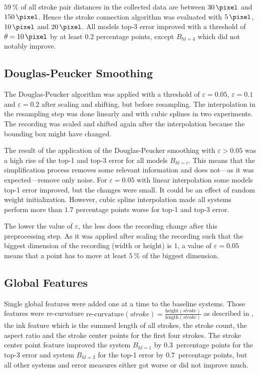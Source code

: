 $\SI{59}{\percent}$ of all stroke pair distances in the collected data are
between $\SI{30}{\pixel}$ and $\SI{150}{\pixel}$. Hence the stroke connection
algorithm was evaluated with $\SI{5}{\pixel}$, $\SI{10}{\pixel}$ and
$\SI{20}{\pixel}$.
All models top-3 error improved with a threshold of $\theta = \SI{10}{\pixel}$
by at least $\num{0.2}$ percentage points, except $B_{hl=4}$ which did not notably
improve.


\subsection{Douglas-Peucker Smoothing}
The Douglas-Peucker algorithm was applied with a threshold of $\varepsilon =
0.05$, $\varepsilon = 0.1$ and $\varepsilon = 0.2$ after scaling and shifting,
but before resampling. The interpolation in the resampling step was done
linearly and with cubic splines in two experiments. The recording was scaled
and shifted again after the interpolation because the bounding box might have
changed.

The result of the application of the Douglas-Peucker smoothing with $\varepsilon
> 0.05$ was a high rise of the top-1 and top-3 error for all models $B_{hl=i}$.
This means that the simplification process removes some relevant information and
does not---as it was expected---remove only noise. For $\varepsilon = 0.05$
with linear interpolation some models top-1 error improved, but the
changes were small. It could be an effect of random weight initialization.
However, cubic spline interpolation made all systems perform more than
$\num{1.7}$ percentage points worse for top-1 and top-3 error.

The lower the value of $\varepsilon$, the less does the recording change after
this preprocessing step. As it was applied after scaling the recording such that
the biggest dimension of the recording (width or height) is $1$, a value of
$\varepsilon = 0.05$ means that a point has to move at least $\SI{5}{\percent}$
of the biggest dimension.


\subsection{Global Features}
Single global features were added one at a time to the baseline systems. Those
features were re-curvature
$\text{re-curvature}(stroke) = \frac{\text{height}(stroke)}{\text{length}(stroke)}$
as described in \cite{Huang06}, the ink feature which is the summed length
of all strokes, the stroke count, the aspect ratio and the stroke center points
for the first four strokes. The stroke center point feature improved the system
$B_{hl=1}$ by $\num{0.3}$~percentage points for the top-3 error and system $B_{hl=3}$ for
the top-1 error by $\num{0.7}$~percentage points, but all other systems and
error measures either got worse or did not improve much.

